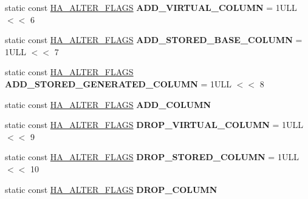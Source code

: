 \begin{DoxyCompactItemize}
\item 
\mbox{\label{classAlter__inplace__info_a0e1c5dac583a4c143c4b9b1daa9b4730}} 
static const \mbox{\hyperlink{classAlter__inplace__info_a45258f36b4942b5cabee7239463daaca}{H\+A\+\_\+\+A\+L\+T\+E\+R\+\_\+\+F\+L\+A\+GS}} {\bfseries A\+D\+D\+\_\+\+V\+I\+R\+T\+U\+A\+L\+\_\+\+C\+O\+L\+U\+MN} = 1\+U\+L\+L $<$$<$ 6
\item 
\mbox{\label{classAlter__inplace__info_a3b9f30c6a43c0e750ff01d0f335e181c}} 
static const \mbox{\hyperlink{classAlter__inplace__info_a45258f36b4942b5cabee7239463daaca}{H\+A\+\_\+\+A\+L\+T\+E\+R\+\_\+\+F\+L\+A\+GS}} {\bfseries A\+D\+D\+\_\+\+S\+T\+O\+R\+E\+D\+\_\+\+B\+A\+S\+E\+\_\+\+C\+O\+L\+U\+MN} = 1\+U\+L\+L $<$$<$ 7
\item 
\mbox{\label{classAlter__inplace__info_a20b484d5b3832ad711ce0c8c928c1072}} 
static const \mbox{\hyperlink{classAlter__inplace__info_a45258f36b4942b5cabee7239463daaca}{H\+A\+\_\+\+A\+L\+T\+E\+R\+\_\+\+F\+L\+A\+GS}} {\bfseries A\+D\+D\+\_\+\+S\+T\+O\+R\+E\+D\+\_\+\+G\+E\+N\+E\+R\+A\+T\+E\+D\+\_\+\+C\+O\+L\+U\+MN} = 1\+U\+L\+L $<$$<$ 8
\item 
static const \mbox{\hyperlink{classAlter__inplace__info_a45258f36b4942b5cabee7239463daaca}{H\+A\+\_\+\+A\+L\+T\+E\+R\+\_\+\+F\+L\+A\+GS}} {\bfseries A\+D\+D\+\_\+\+C\+O\+L\+U\+MN}
\item 
\mbox{\label{classAlter__inplace__info_adff2155cc00d1f866b63c2fc7c1adad4}} 
static const \mbox{\hyperlink{classAlter__inplace__info_a45258f36b4942b5cabee7239463daaca}{H\+A\+\_\+\+A\+L\+T\+E\+R\+\_\+\+F\+L\+A\+GS}} {\bfseries D\+R\+O\+P\+\_\+\+V\+I\+R\+T\+U\+A\+L\+\_\+\+C\+O\+L\+U\+MN} = 1\+U\+L\+L $<$$<$ 9
\item 
\mbox{\label{classAlter__inplace__info_afd53e3907c5f7931adf78f5bf7829756}} 
static const \mbox{\hyperlink{classAlter__inplace__info_a45258f36b4942b5cabee7239463daaca}{H\+A\+\_\+\+A\+L\+T\+E\+R\+\_\+\+F\+L\+A\+GS}} {\bfseries D\+R\+O\+P\+\_\+\+S\+T\+O\+R\+E\+D\+\_\+\+C\+O\+L\+U\+MN} = 1\+U\+L\+L $<$$<$ 10
\item 
static const \mbox{\hyperlink{classAlter__inplace__info_a45258f36b4942b5cabee7239463daaca}{H\+A\+\_\+\+A\+L\+T\+E\+R\+\_\+\+F\+L\+A\+GS}} {\bfseries D\+R\+O\+P\+\_\+\+C\+O\+L\+U\+MN}
$$
\end{DoxyCompactItemize}
